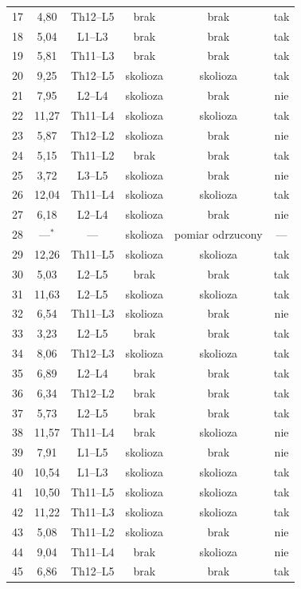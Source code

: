 \begin{longtable}{cccccc}
    17 & 4,80 & Th12--L5 & brak & brak & tak \\
    18 & 5,04 & L1--L3 & brak & brak & tak \\
    19 & 5,81 & Th11--L3 & brak & brak & tak \\
    20 & 9,25 & Th12--L5 & skolioza & skolioza & tak \\
    21 & 7,95 & L2--L4 & skolioza & brak & nie \\
    22 & 11,27 & Th11--L4 & skolioza & skolioza & tak \\
    23 & 5,87 & Th12--L2 & skolioza & brak & nie \\
    24 & 5,15 & Th11--L2 & brak & brak & tak \\
    25 & 3,72 & L3--L5 & skolioza & brak & nie \\
    26 & 12,04 & Th11--L4 & skolioza & skolioza & tak \\
    27 & 6,18 & L2--L4 & skolioza & brak & nie \\
    28 & ---$^{*}$ & --- & skolioza & pomiar odrzucony & --- \\
    29 & 12,26 & Th11--L5 & skolioza & skolioza & tak \\
    30 & 5,03 & L2--L5 & brak & brak & tak \\
    31 & 11,63 & L2--L5 & skolioza & skolioza & tak \\
    32 & 6,54 & Th11--L3 & skolioza & brak & nie \\
    33 & 3,23 & L2--L5 & brak & brak & tak \\
    34 & 8,06 & Th12--L3 & skolioza & skolioza & tak \\
    35 & 6,89 & L2--L4 & brak & brak & tak \\
    36 & 6,34 & Th12--L2 & brak & brak & tak \\
    37 & 5,73 & L2--L5 & brak & brak & tak \\
    38 & 11,57 & Th11--L4 & brak & skolioza & nie \\
    39 & 7,91 & L1--L5 & skolioza & brak & nie \\
    40 & 10,54 & L1--L3 & skolioza & skolioza & tak \\
    41 & 10,50 & Th11--L5 & skolioza & skolioza & tak \\
    42 & 11,22 & Th11--L3 & skolioza & skolioza & tak \\
    43 & 5,08 & Th11--L2 & skolioza & brak & nie \\
    44 & 9,04 & Th11--L4 & brak & skolioza & nie \\
    45 & 6,86 & Th12--L5 & brak & brak & tak \\

\end{longtable}
